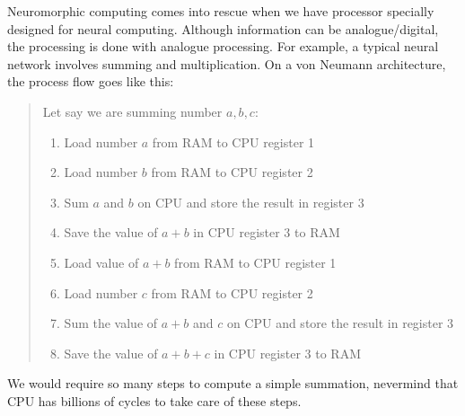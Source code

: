 Neuromorphic computing comes into rescue when we have processor specially designed for neural computing. Although information can be analogue/digital, the processing is done with analogue processing. For example, a typical neural network involves summing and multiplication. On a von Neumann architecture, the process flow goes like this:
\begin{quote}
	Let say we are summing number $a,b,c$:
	\begin{enumerate}
		\item Load number $a$ from RAM to CPU register 1
		\item Load number $b$ from RAM to CPU register 2
		\item Sum $a$ and $b$ on CPU and store the result in register 3
		\item Save the value of $a+b$ in CPU register 3 to RAM
		\item Load value of $a+b$ from RAM to CPU register 1
		\item Load number $c$ from RAM to CPU register 2
		\item Sum the value of $a+b$ and $c$ on CPU and store the result in register 3
		\item Save the value of $a+b+c$ in CPU register 3 to RAM
	\end{enumerate}
\end{quote}
We would require so many steps to compute a simple summation, nevermind that CPU has billions of cycles to take care of these steps.
